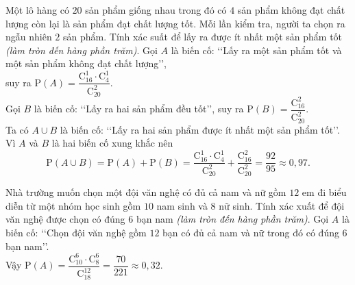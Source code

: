 \begin{bt}%
Một lô hàng có $20$ sản phẩm giống nhau trong đó có $4$ sản phẩm không đạt chất lượng còn lại là sản phẩm đạt chất lượng tốt. Mỗi lần kiểm tra, người ta chọn ra ngẫu nhiên $2$ sản phẩm. Tính xác suất để lấy ra được ít nhất một sản phẩm tốt \textit{(làm tròn đến hàng phần trăm)}.
\loigiai
{
Gọi $A$ là biến cố: \lq\lq Lấy ra một sản phẩm tốt và một sản phẩm không đạt chất lượng\rq\rq, \\
suy ra $\mathrm{P}(A)=\dfrac{\mathrm{C}_{16}^{1}\cdot\mathrm{C}_{4}^{1}}{\mathrm{C}_{20}^{2}}$.\\
Gọi $B$ là biến cố: \lq\lq Lấy ra hai sản phẩm đều tốt\rq\rq, suy ra $\mathrm{P}(B)=\dfrac{\mathrm{C}_{16}^{2}}{\mathrm{C}_{20}^{2}}$.\\
Ta có $A\cup B$ là biến cố: \lq\lq Lấy ra hai sản phẩm được ít nhất một sản phẩm tốt\rq\rq.\\
Vì $A$ và $B$ là hai biến cố xung khắc nên
$$\mathrm{P}(A\cup B)=\mathrm{P}(A)+\mathrm{P}(B)=\dfrac{\mathrm{C}_{16}^{1}\cdot\mathrm{C}_{4}^{1}}{\mathrm{C}_{20}^{2}}+\dfrac{\mathrm{C}_{16}^{2}}{\mathrm{C}_{20}^{2}}=\dfrac{92}{95}\approx0{,}97.$$
}
\end{bt}

\begin{bt}%
Nhà trường muốn chọn một đội văn nghệ có đủ cả nam và nữ gồm $12$ em đi biểu diễn từ một nhóm học sinh gồm $10$ nam sinh và $8$ nữ sinh. Tính xác xuất để đội văn nghệ được chọn có đúng $6$ bạn nam \textit{(làm tròn đến hàng phần trăm)}.
\loigiai
{
Gọi $A$ là biến cố: \lq\lq Chọn đội văn nghệ gồm $12$ bạn có đủ cả nam và nữ trong đó có đúng $6$ bạn nam\rq\rq.\\
Vậy $\mathrm{P}(A)=\dfrac{\mathrm{C}_{10}^{6}\cdot\mathrm{C}_{8}^{6}}{\mathrm{C}_{18}^{12}}=\dfrac{70}{221}\approx0{,}32$.
}
\end{bt}

